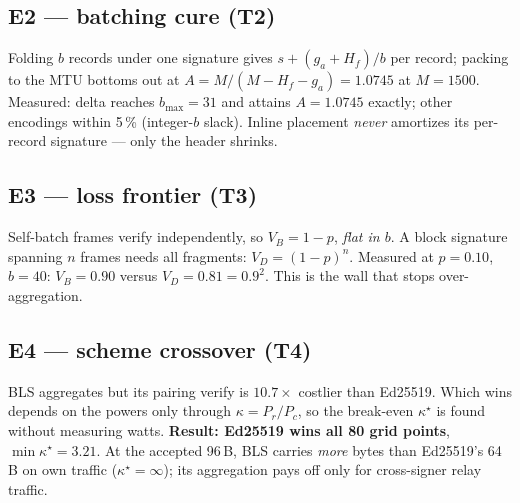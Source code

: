 \documentclass[11pt,a4paper]{article}
\begin{document}
\subsection{E2 --- batching cure (T2)}
Folding $b$ records under one signature gives $s+(g_a+H_f)/b$ per record; packing to the MTU bottoms
out at $A = M/(M-H_f-g_a) = 1.0745$ at $M=1500$. Measured: delta reaches $b_{\max}=31$ and attains
$A=1.0745$ exactly; other encodings within 5\,\% (integer-$b$ slack). Inline placement \emph{never}
amortizes its per-record signature --- only the header shrinks.

\subsection{E3 --- loss frontier (T3)}
Self-batch frames verify independently, so $V_B = 1-p$, \emph{flat in $b$}. A block signature
spanning $n$ frames needs all fragments: $V_D=(1-p)^n$. Measured at $p=0.10$, $b=40$:
$V_B=0.90$ versus $V_D=0.81=0.9^2$. This is the wall that stops over-aggregation.

\subsection{E4 --- scheme crossover (T4)}
BLS aggregates but its pairing verify is $10.7\times$ costlier than Ed25519. Which wins depends on the
powers only through $\kappa=P_r/P_c$, so the break-even $\kappa^\star$ is found without measuring
watts. \textbf{Result: Ed25519 wins all 80 grid points}, $\min\kappa^\star=3.21$. At the accepted
96\,B, BLS carries \emph{more} bytes than Ed25519's 64\,B on own traffic ($\kappa^\star=\infty$);
its aggregation pays off only for cross-signer relay traffic.
\end{document}
